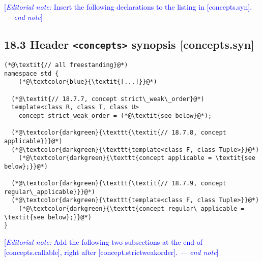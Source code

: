 \documentclass{article}
\begin{document}
\textcolor{blue}{[\textit{Editorial note:} Insert the following declarations
to the listing in [concepts.syn]. \textit{--- end note}]}

\subsection*{18.3 Header \texttt{<concepts>} synopsis [concepts.syn]}
\begin{lstlisting}[style=base]
(*@\textit{// all freestanding}@*)
namespace std {
    (*@\textcolor{blue}{\textit{[...]}}@*)

  (*@\textit{// 18.7.7, concept strict\_weak\_order}@*)
  template<class R, class T, class U>
    concept strict_weak_order = (*@\textit{see below}@*);

  (*@\textcolor{darkgreen}{\texttt{\textit{// 18.7.8, concept applicable}}}@*)
  (*@\textcolor{darkgreen}{\texttt{template<class F, class Tuple>}}@*)
    (*@\textcolor{darkgreen}{\texttt{concept applicable = \textit{see below};}}@*)

  (*@\textcolor{darkgreen}{\texttt{\textit{// 18.7.9, concept regular\_applicable}}}@*)
  (*@\textcolor{darkgreen}{\texttt{template<class F, class Tuple>}}@*)
    (*@\textcolor{darkgreen}{\texttt{concept regular\_applicable = \textit{see below};}}@*)
}
\end{lstlisting}

\textcolor{blue}{[\textit{Editorial note:} Add the following two subsections at
the end of [concepts.callable], right after [concept.strictweakorder].
\textit{--- end note}]}
\end{document}
